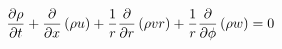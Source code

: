 \begin{equation}
  \pdv{\rho}{t}
  + \pdv{x}\left(\rho u\right)
  + \frac{1}{r}\pdv{r}\left(\rho v r \right)
  + \frac{1}{r}\pdv{\phi}\left(\rho w\right) = 0
\end{equation}

